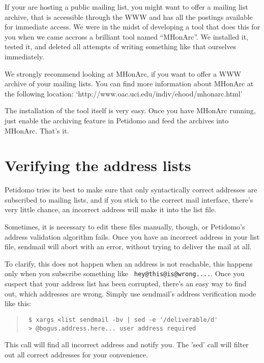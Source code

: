\documentclass[a4paper,11pt]{scrreprt}
\newcommand{\file}[1]{{\sf #1}}
\begin{document}
If your are hosting a public mailing list, you might want to offer a
mailing list archive, that is accessible through the WWW and has all
the postings available for immediate access. We were in the midst of
developing a tool that does this for you when we came accross a
brilliant tool named ``MHonArc''. We installed it, tested it, and
deleted all attempts of writing something like that ourselves
immediately.

We strongly recommend looking at MHonArc, if you want to offer a WWW
archive of your mailing lists. You can find more information about
MHonArc at the following location:
`http://www.oac.uci.edu/indiv/ehood/mhonarc.html'

The installation of the tool itself is very easy. Once you have
MHonArc running, just enable the archiving feature in Petidomo and
feed the archives into MHonArc. That's it.

\section{Verifying the address lists}

Petidomo tries its best to make sure that only syntactically correct
addresses are subscribed to mailing lists, and if you stick to the
correct mail interface, there's very little chance, an incorrect
address will make it into the \file{list} file.

Sometimes, it is necessary to edit these files manually, though, or
Petidomo's address validation algorithm fails. Once you have an
incorrect address in your list file, sendmail will abort with an
error, without trying to deliver the mail at all.

To clarify, this does not happen when an address is not reachable,
this happens only when you subscribe something like {\tt
hey@this@is@wrong....}. Once you suspect that your address list has
been corrupted, there's an easy way to find out, which addresses are
wrong. Simply use sendmail's address verification mode like this:

\begin{quote}
\begin{verbatim}
 $ xargs <list sendmail -bv | sed -e '/deliverable/d'
 > @bogus.address.here... user address required
\end{verbatim}
\end{quote}

This call will find all incorrect address and notify you. The 'sed'
call will filter out all correct addresses for your convenience.
\end{document}

